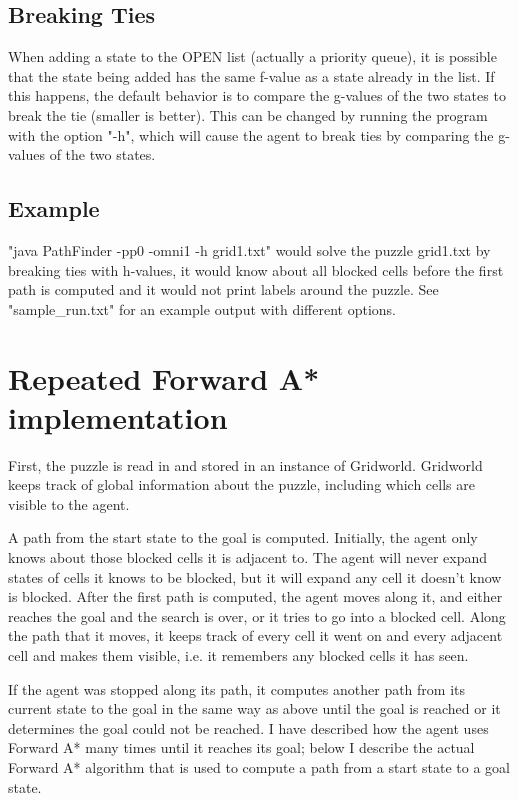 \documentclass[letterpaper,11pt]{article}
\begin{document}
\subsection{Breaking Ties}
When adding a state to the OPEN list (actually a priority queue), it is
possible that the state being added has the same f-value as a state already in
the list. If this happens, the default behavior is to compare the g-values of
the two states to break the tie (smaller is better). This can be changed by
running the program with the option "-h", which will cause the agent to break
ties by comparing the g-values of the two states.

\subsection{Example}
"java PathFinder -pp0 -omni1 -h grid1.txt" would solve the puzzle grid1.txt by
breaking ties with h-values, it would know about all blocked cells before the
first path is computed and it would not print labels around the puzzle. See
"sample\_run.txt" for an example output with different options.

\section{Repeated Forward A* implementation}
First, the puzzle is read in and stored in an instance of Gridworld. Gridworld
keeps track of global information about the puzzle, including which cells are
visible to the agent.

A path from the start state to the goal is computed. Initially, the agent only
knows about those blocked cells it is adjacent to. The agent will never expand
states of cells it knows to be blocked, but it will expand any cell it doesn't
know is blocked. After the first path is computed, the agent moves along it,
and either reaches the goal and the search is over, or it tries to go into a
blocked cell. Along the path that it moves, it keeps track of every cell it
went on and every adjacent cell and makes them visible, i.e. it remembers any
blocked cells it has seen.

If the agent was stopped along its path, it computes another path from its
current state to the goal in the same way as above until the goal is reached or
it determines the goal could not be reached. I have described how the agent
uses Forward A* many times until it reaches its goal; below I describe the
actual Forward A* algorithm that is used to compute a path from a start state
to a goal state.
\end{document}
